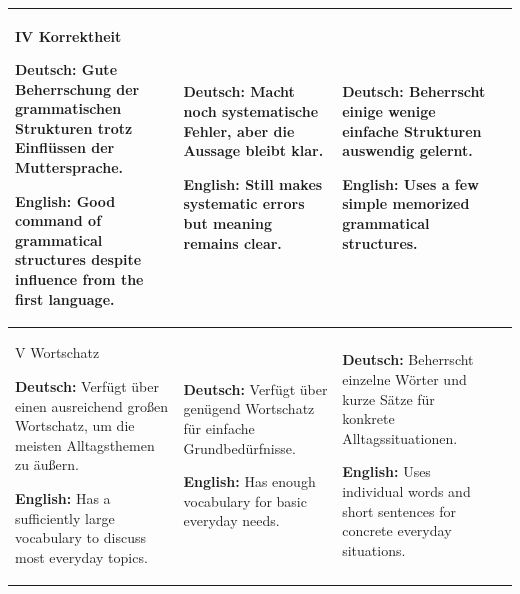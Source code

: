 \documentclass[a4paper]{article}
\begin{document}
\begin{table}[H]
\begin{tabular}{|p{3cm}|p{4cm}|p{4cm}|p{4cm}|}
                    IV Korrektheit
                    
                    \textbf{Deutsch:} Gute Beherrschung der grammatischen Strukturen trotz Einflüssen der Muttersprache.
                    
                    \textbf{English:} Good command of grammatical structures despite influence from the first language.
                    &
                    \textbf{Deutsch:} Macht noch systematische Fehler, aber die Aussage bleibt klar.
                    
                    \textbf{English:} Still makes systematic errors but meaning remains clear.
                    &
                    \textbf{Deutsch:} Beherrscht einige wenige einfache Strukturen auswendig gelernt.
                    
                    \textbf{English:} Uses a few simple memorized grammatical structures.
                    \\
                    \hline
                    
                    V Wortschatz
                    
                    \textbf{Deutsch:} Verfügt über einen ausreichend großen Wortschatz, um die meisten Alltagsthemen zu äußern.
                    
                    \textbf{English:} Has a sufficiently large vocabulary to discuss most everyday topics.
                    &
                    \textbf{Deutsch:} Verfügt über genügend Wortschatz für einfache Grundbedürfnisse.
                    
                    \textbf{English:} Has enough vocabulary for basic everyday needs.
                    &
                    \textbf{Deutsch:} Beherrscht einzelne Wörter und kurze Sätze für konkrete Alltagssituationen.
                    
                    \textbf{English:} Uses individual words and short sentences for concrete everyday situations.
                    \\
                    \hline
                
                \end{tabular}
            \end{table}
\end{document}
